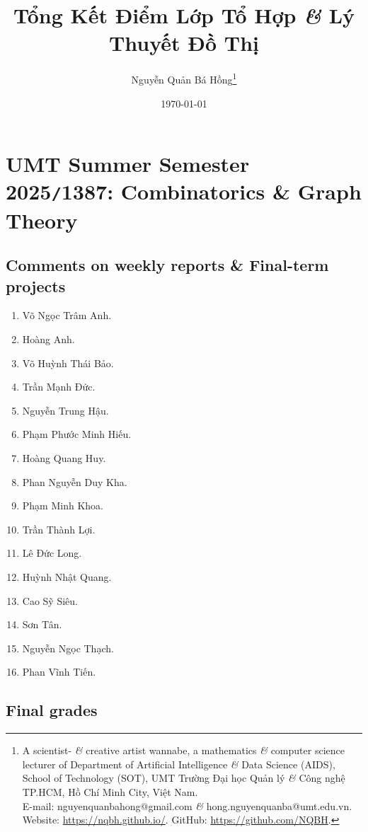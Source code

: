 \documentclass{article}
\title{Tổng Kết Điểm Lớp Tổ Hợp {\it\&} Lý Thuyết Đồ Thị}
\author{Nguyễn Quản Bá Hồng\footnote{A scientist- {\it\&} creative artist wannabe, a mathematics {\it\&} computer science lecturer of Department of Artificial Intelligence {\it\&} Data Science (AIDS), School of Technology (SOT), UMT Trường Đại học Quản lý {\it\&} Công nghệ TP.HCM, Hồ Chí Minh City, Việt Nam.\\E-mail: {\sf nguyenquanbahong@gmail.com} {\it\&} {\sf hong.nguyenquanba@umt.edu.vn}. Website: \url{https://nqbh.github.io/}. GitHub: \url{https://github.com/NQBH}.}}
\date{\today}
\begin{document}
\maketitle


\section{UMT Summer Semester 2025{\tt/}1387: Combinatorics \& Graph Theory}


\subsection{Comments on weekly reports \& Final-term projects}

\begin{enumerate}
    \item {\sc Võ Ngọc Trâm Anh.}
    \item {\sc Hoàng Anh.}
    \item {\sc Võ Huỳnh Thái Bảo.}
    \item {\sc Trần Mạnh Đức.}
    \item {\sc Nguyễn Trung Hậu.}
    \item {\sc Phạm Phước Minh Hiếu.}
    \item {\sc Hoàng Quang Huy.}
    \item {\sc Phan Nguyễn Duy Kha.}
    \item {\sc Phạm Minh Khoa.}
    \item {\sc Trần Thành Lợi.}
    \item {\sc Lê Đức Long.}
    \item {\sc Huỳnh Nhật Quang.}
    \item {\sc Cao Sỹ Siêu.}
    \item {\sc Sơn Tân.}
    \item {\sc Nguyễn Ngọc Thạch.}
    \item {\sc Phan Vĩnh Tiến.}
\end{enumerate}


\subsection{Final grades}
\end{document}
